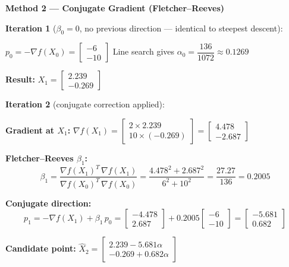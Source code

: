 \documentclass[11pt,a4paper]{article}
\newcommand{\sectionbox}[1]{%
  \begin{mdframed}[backgroundcolor=headbg, linewidth=0pt,
    innertopmargin=4pt, innerbottommargin=4pt,
    innerleftmargin=8pt, innerrightmargin=8pt]
    \large\bfseries\color{white}#1
  \end{mdframed}\vspace{4pt}
}
\newenvironment{methodbox}[1]{%
  \begin{mdframed}[backgroundcolor=#1, linewidth=0.5pt,
    innertopmargin=6pt, innerbottommargin=6pt,
    innerleftmargin=10pt, innerrightmargin=10pt]
}{%
  \end{mdframed}\vspace{4pt}
}
\begin{document}
\sectionbox{Method 2 --- Conjugate Gradient (Fletcher--Reeves)}

\begin{methodbox}{sdbg}
\textbf{Iteration 1} ($\beta_0 = 0$, no previous direction --- identical to steepest descent):

\medskip
$\boxed{p_0 = -\nabla f(X_0) = \begin{bmatrix}-6\\-10\end{bmatrix}}$
\quad Line search gives $\alpha_0 = \dfrac{136}{1072} \approx 0.1269$

\medskip
\textbf{Result:}\quad
$X_1 = \begin{bmatrix}2.239\\-0.269\end{bmatrix}$

\bigskip
\textbf{Iteration 2} (conjugate correction applied):

\medskip
\textbf{Gradient at $X_1$:}\quad
$\nabla f(X_1) = \begin{bmatrix}2\times2.239\\10\times(-0.269)\end{bmatrix} = \begin{bmatrix}4.478\\-2.687\end{bmatrix}$

\medskip
\textbf{Fletcher--Reeves $\beta_1$:}
\[
  \beta_1 = \frac{\nabla f(X_1)^T\,\nabla f(X_1)}{\nabla f(X_0)^T\,\nabla f(X_0)}
          = \frac{4.478^2 + 2.687^2}{6^2 + 10^2}
          = \frac{27.27}{136} = 0.2005
\]

\textbf{Conjugate direction:}
\[
  \boxed{p_1 = -\nabla f(X_1) + \beta_1\,p_0}
  = \begin{bmatrix}-4.478\\2.687\end{bmatrix} + 0.2005\begin{bmatrix}-6\\-10\end{bmatrix}
  = \begin{bmatrix}-5.681\\0.682\end{bmatrix}
\]

\textbf{Candidate point:}\quad
$\hat{X}_2 = \begin{bmatrix}2.239 - 5.681\alpha\\-0.269 + 0.682\alpha\end{bmatrix}$


\end{methodbox}
\end{document}
